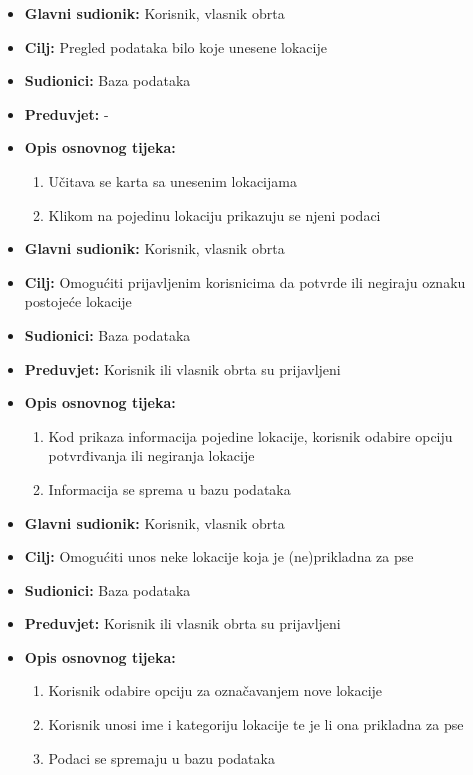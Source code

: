 			\noindent{}
				\begin{itemize}
					\item \textbf{Glavni sudionik: } Korisnik, vlasnik obrta 
					\item \textbf{Cilj: }Pregled podataka bilo koje unesene lokacije
					\item \textbf{Sudionici: } Baza podataka 
					\item \textbf{Preduvjet: } -
					\item \textbf{Opis osnovnog tijeka: }
					\begin{enumerate}
						\item Učitava se karta sa unesenim lokacijama
						\item Klikom na pojedinu lokaciju prikazuju se njeni podaci
					\end{enumerate}
				\end{itemize}
					
			\noindent{}
				\begin{itemize}
					\item \textbf{Glavni sudionik: } Korisnik, vlasnik obrta 
					\item \textbf{Cilj: }Omogućiti prijavljenim korisnicima da potvrde ili negiraju oznaku postojeće lokacije
					\item \textbf{Sudionici: } Baza podataka 
					\item \textbf{Preduvjet: } Korisnik ili vlasnik obrta su prijavljeni
					\item \textbf{Opis osnovnog tijeka: }
					\begin{enumerate}
						\item Kod prikaza informacija pojedine lokacije, korisnik odabire opciju potvrđivanja ili negiranja lokacije
						\item Informacija se sprema u bazu podataka
					\end{enumerate}
				\end{itemize}
					
			\noindent{}
				\begin{itemize}
					\item \textbf{Glavni sudionik: } Korisnik, vlasnik obrta 
					\item \textbf{Cilj: }Omogućiti unos neke lokacije koja je (ne)prikladna za pse
					\item \textbf{Sudionici: } Baza podataka 
					\item \textbf{Preduvjet: } Korisnik ili vlasnik obrta su prijavljeni
					\item \textbf{Opis osnovnog tijeka: }
					\begin{enumerate}
						\item Korisnik odabire opciju za označavanjem nove lokacije
						\item Korisnik unosi ime i kategoriju lokacije te je li ona prikladna za pse
						\item Podaci se spremaju u bazu podataka
					\end{enumerate}
				\end{itemize}
					
